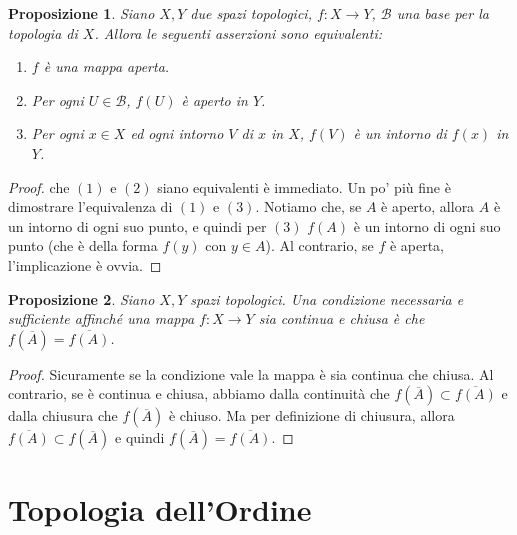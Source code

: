 \documentclass[10pt,a4paper]{article}
\theoremstyle{definition}
\theoremstyle{plain}
\newtheorem{prop}{Proposizione}
\theoremstyle{remark}
\theoremstyle{remark}
\newcommand{\B}{\mathcal{B}}
\begin{document}
\begin{prop} Siano $X,Y$ due spazi topologici, $f: X \to Y$, $\B$ una base per
la topologia di $X$. Allora le seguenti asserzioni sono equivalenti:
\begin{enumerate}
\item $f$ è una mappa aperta.
\item Per ogni $U \in \B$, $f(U)$ è aperto in $Y$.
\item Per ogni $x \in X$ ed ogni intorno $V$ di $x$ in $X$, $f(V)$ è un intorno
di $f(x)$ in $Y$.
\end{enumerate}
\end{prop}
\begin{proof} che $(1)$ e $(2)$ siano equivalenti è immediato. Un po' più fine è
dimostrare l'equivalenza di $(1)$ e $(3)$. Notiamo che, se $A$ è aperto, allora
$A$ è un intorno di ogni suo punto, e quindi per $(3)$ $f(A)$ è un intorno di
ogni suo punto (che è della forma $f(y)$ con $y \in A$). Al contrario, se $f$ è
aperta, l'implicazione è ovvia.
\end{proof}



\begin{prop} Siano $X,Y$ spazi topologici. Una condizione necessaria e
sufficiente affinché una mappa $f : X \to Y$ sia continua e chiusa è che
$f(\overline{A}) = \overline{f(A)}$.
\end{prop}
\begin{proof} Sicuramente se la condizione vale la mappa è sia continua che
chiusa. Al contrario, se è continua e chiusa, abbiamo dalla continuità che
$f(\overline{A}) \subset \overline{f(A)}$ e dalla chiusura che $f(\overline{A})$
è chiuso. Ma per definizione di chiusura, allora $ \overline{f(A)} \subset
f(\overline{A})$ e quindi $f(\overline{A}) = \overline{f(A)}$.
\end{proof}

\section{Topologia dell'Ordine}
\end{document}
